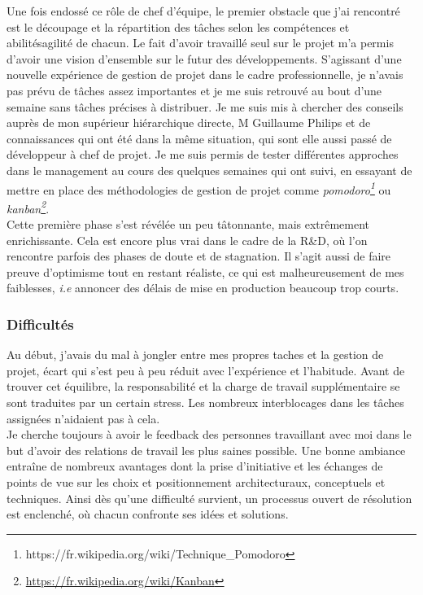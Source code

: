 \documentclass[french, 11pt]{memoir}
\begin{document}
Une fois endossé ce rôle de chef d'équipe, le premier obstacle que j'ai
rencontré est le découpage et la répartition des tâches selon les
compétences et abilitésagilité de chacun. Le fait d'avoir travaillé seul
sur le projet m'a permis d'avoir une vision d'ensemble sur le futur des
développements. S'agissant d'une nouvelle expérience de gestion de
projet dans le cadre professionnelle, je n'avais pas prévu de tâches
assez importantes et je me suis retrouvé au bout d'une semaine sans
tâches précises à distribuer. Je me suis mis à chercher des conseils
auprès de mon supérieur hiérarchique directe, M Guillaume Philips et de
connaissances qui ont été dans la même situation, qui sont elle aussi
passé de développeur à chef de projet. Je me suis permis de tester
différentes approches dans le management au cours des quelques semaines
qui ont suivi, en essayant de mettre en place des méthodologies de
gestion de projet comme \emph{pomodoro\footnote{https://fr.wikipedia.org/wiki/Technique\_Pomodoro} }ou \emph{kanban\footnote{\url{https://fr.wikipedia.org/wiki/Kanban}}}. \\
Cette première
phase s'est révélée un peu tâtonnante, mais extrêmement enrichissante.
Cela est encore plus vrai dans le cadre de la R\&D, où l'on rencontre
parfois des phases de doute et de stagnation. Il s'agit aussi de faire
preuve d'optimisme tout en restant réaliste, ce qui est malheureusement
de mes faiblesses, \textit{i.e} annoncer des délais de mise en production
beaucoup trop courts.

\subsubsection{Difficultés}\label{difficultuxe9s}

Au début, j'avais du mal à jongler entre mes propres taches et la
gestion de projet, écart qui s'est peu à peu réduit avec l'expérience et
l'habitude. Avant de trouver cet équilibre, la responsabilité et la
charge de travail supplémentaire se sont traduites par un certain
stress. Les nombreux interblocages dans les tâches assignées
n'aidaient pas à cela. \\
Je cherche toujours à avoir le feedback des
personnes travaillant avec moi dans le but d'avoir des relations de
travail les plus saines possible. Une bonne ambiance entraîne de
nombreux avantages dont la prise d'initiative et les échanges de points
de vue sur les choix et positionnement architecturaux, conceptuels et
techniques. Ainsi dès qu'une difficulté survient, un processus ouvert de
résolution est enclenché, où chacun confronte ses idées et solutions.
\end{document}
